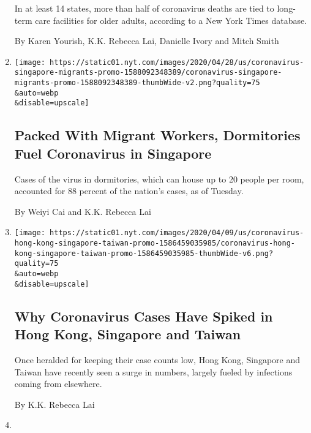 \begin{enumerate}
  In at least 14 states, more than half of coronavirus deaths are tied
  to long-term care facilities for older adults, according to a New York
  Times database.

  By Karen Yourish, K.K. Rebecca Lai, Danielle Ivory and Mitch Smith
\item
  \href{/interactive/2020/04/28/world/asia/coronavirus-singapore-migrants.html}{}

  \texttt{[image: https://static01.nyt.com/images/2020/04/28/us/coronavirus-singapore-migrants-promo-1588092348389/coronavirus-singapore-migrants-promo-1588092348389-thumbWide-v2.png?quality=75\\\&auto=webp\\\&disable=upscale]}

  \hypertarget{packed-with-migrant-workers-dormitories-fuel-coronavirus-in-singapore}{%
  \subsection{Packed With Migrant Workers, Dormitories Fuel Coronavirus
  in
  Singapore}\label{packed-with-migrant-workers-dormitories-fuel-coronavirus-in-singapore}}

  Cases of the virus in dormitories, which can house up to 20 people per
  room, accounted for 88 percent of the nation's cases, as of Tuesday.

  By Weiyi Cai and K.K. Rebecca Lai
\item
  \href{/interactive/2020/04/09/world/asia/coronavirus-hong-kong-singapore-taiwan.html}{}

  \texttt{[image: https://static01.nyt.com/images/2020/04/09/us/coronavirus-hong-kong-singapore-taiwan-promo-1586459035985/coronavirus-hong-kong-singapore-taiwan-promo-1586459035985-thumbWide-v6.png?quality=75\\\&auto=webp\\\&disable=upscale]}

  \hypertarget{why-coronavirus-cases-have-spiked-in-hong-kong-singapore-and-taiwan}{%
  \subsection{Why Coronavirus Cases Have Spiked in Hong Kong, Singapore
  and
  Taiwan}\label{why-coronavirus-cases-have-spiked-in-hong-kong-singapore-and-taiwan}}

  Once heralded for keeping their case counts low, Hong Kong, Singapore
  and Taiwan have recently seen a surge in numbers, largely fueled by
  infections coming from elsewhere.

  By K.K. Rebecca Lai
\item
  \href{/interactive/2020/04/03/world/coronavirus-flatten-the-curve-countries.html}{}


\end{enumerate}
